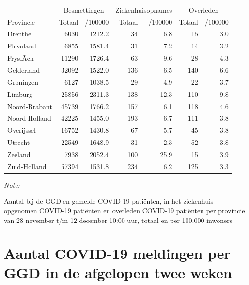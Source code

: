 \documentclass[
  english,
  man,floatsintext]{apa6}
\begin{document}
\begin{table}
\centering
\begin{threeparttable}
\begin{tabular}{lrrrrrr}
\toprule
\multicolumn{1}{c}{ } & \multicolumn{2}{c}{Besmettingen} & \multicolumn{2}{c}{Ziekenhuisopnames} & \multicolumn{2}{c}{Overleden} \\
\cmidrule(l{3pt}r{3pt}){2-3} \cmidrule(l{3pt}r{3pt}){4-5} \cmidrule(l{3pt}r{3pt}){6-7}
Provincie & Totaal & /100000 & Totaal & /100000 & Totaal & /100000\\
\midrule
Drenthe & 6030 & 1212.2 & 34 & 6.8 & 15 & 3.0\\
Flevoland & 6855 & 1581.4 & 31 & 7.2 & 14 & 3.2\\
FryslÃ¢n & 11290 & 1726.4 & 63 & 9.6 & 28 & 4.3\\
Gelderland & 32092 & 1522.0 & 136 & 6.5 & 140 & 6.6\\
Groningen & 6127 & 1038.5 & 29 & 4.9 & 22 & 3.7\\
Limburg & 25856 & 2311.3 & 138 & 12.3 & 110 & 9.8\\
Noord-Brabant & 45739 & 1766.2 & 157 & 6.1 & 118 & 4.6\\
Noord-Holland & 42225 & 1455.0 & 193 & 6.7 & 111 & 3.8\\
Overijssel & 16752 & 1430.8 & 67 & 5.7 & 45 & 3.8\\
Utrecht & 22549 & 1648.9 & 31 & 2.3 & 52 & 3.8\\
Zeeland & 7938 & 2052.4 & 100 & 25.9 & 15 & 3.9\\
Zuid-Holland & 57394 & 1531.8 & 234 & 6.2 & 125 & 3.3\\
\bottomrule
\end{tabular}
\begin{tablenotes}
\item \textit{Note: } 
\item Aantal bij de GGD’en gemelde COVID-19 patiënten, in het ziekenhuis opgenomen COVID-19 patiënten en overleden COVID-19 patiënten per provincie van 28 november t/m 12 december 10:00 uur, totaal en per 100.000 inwoners
\end{tablenotes}
\end{threeparttable}
\end{table}

\newpage

\hypertarget{aantal-covid-19-meldingen-per-ggd-in-de-afgelopen-twee-weken}{%
\section{Aantal COVID-19 meldingen per GGD in de afgelopen twee weken}\label{aantal-covid-19-meldingen-per-ggd-in-de-afgelopen-twee-weken}}
\end{document}
